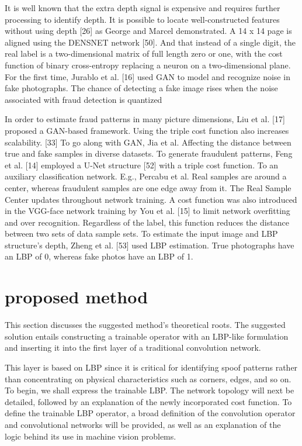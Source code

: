 \documentclass[journal]{IEEEtran}
\begin{document}
It is well known that the extra depth signal is expensive and requires further processing to identify depth.
It is possible to locate well-constructed features without using depth [26] as George and Marcel demonstrated. A 14 x 14 page is aligned using the DENSNET network [50]. And that instead of a single digit, the real label is a two-dimensional matrix of full length zero or one, with the cost function of binary cross-entropy replacing a neuron on a two-dimensional plane.
For the first time, Jurablo et al. [16] used GAN to model and recognize noise in fake photographs. The chance of detecting a fake image rises when the noise associated with fraud detection is quantized

In order to estimate fraud patterns in many picture dimensions, Liu et al. [17] proposed a GAN-based framework.
Using the triple cost function also increases scalability. [33]
To go along with GAN, Jia et al. Affecting the distance between true and fake samples in diverse datasets.
To generate fraudulent patterns, Feng et al. [14] employed a U-Net structure [52] with a triple cost function. To an auxiliary classification network.
E.g., Percabu et al.
Real samples are around a center, whereas fraudulent samples are one edge away from it. The Real Sample Center updates throughout network training.
A cost function was also introduced in the VGG-face network training by You et al. [15] to limit network overfitting and over recognition. Regardless of the label, this function reduces the distance between two sets of data sample sets.
To estimate the input image and LBP structure's depth, Zheng et al. [53] used LBP estimation. True photographs have an LBP of 0, whereas fake photos have an LBP of 1.

\section{proposed method}
This section discusses the suggested method's theoretical roots. The suggested solution entails constructing a trainable operator with an LBP-like formulation and inserting it into the first layer of a traditional convolution network.

This layer is based on LBP since it is critical for identifying spoof patterns rather than concentrating on physical characteristics such as corners, edges, and so on.
To begin, we shall express the trainable LBP. The network topology will next be detailed, followed by an explanation of the newly incorporated cost function. To define the trainable LBP operator, a broad definition of the convolution operator and convolutional networks will be provided, as well as an explanation of the logic behind its use in machine vision problems.
\end{document}

